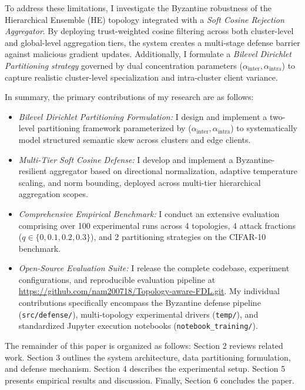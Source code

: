 \documentclass[11pt, a4paper]{article}
\begin{document}
To address these limitations, I investigate the Byzantine robustness of the Hierarchical Ensemble (HE) topology integrated with a \textit{Soft Cosine Rejection Aggregator}. By deploying trust-weighted cosine filtering across both cluster-level and global-level aggregation tiers, the system creates a multi-stage defense barrier against malicious gradient updates. Additionally, I formulate a \textit{Bilevel Dirichlet Partitioning strategy} governed by dual concentration parameters ($\alpha_{\text{inter}}, \alpha_{\text{intra}}$) to capture realistic cluster-level specialization and intra-cluster client variance. 

In summary, the primary contributions of my research are as follows:
\begin{itemize}
    \item \textit{Bilevel Dirichlet Partitioning Formulation:} I design and implement a two-level partitioning framework parameterized by ($\alpha_{\text{inter}}, \alpha_{\text{intra}}$) to systematically model structured semantic skew across clusters and edge clients.
    \item \textit{Multi-Tier Soft Cosine Defense:} I develop and implement a Byzantine-resilient aggregator based on directional normalization, adaptive temperature scaling, and norm bounding, deployed across multi-tier hierarchical aggregation scopes.
    \item \textit{Comprehensive Empirical Benchmark:} I conduct an extensive evaluation comprising over 100 experimental runs across 4 topologies, 4 attack fractions ($q \in \{0, 0.1, 0.2, 0.3\}$), and 2 partitioning strategies on the CIFAR-10 benchmark.
    \item \textit{Open-Source Evaluation Suite:} I release the complete codebase, experiment configurations, and reproducible evaluation pipeline at \url{https://github.com/nam200718/Topology-aware-FDL.git}. My individual contributions specifically encompass the Byzantine defense pipeline (\texttt{src/defense/}), multi-topology experimental drivers (\texttt{temp/}), and standardized Jupyter execution notebooks (\texttt{notebook\_training/}).
\end{itemize}

The remainder of this paper is organized as follows: Section 2 reviews related work. Section 3 outlines the system architecture, data partitioning formulation, and defense mechanism. Section 4 describes the experimental setup. Section 5 presents empirical results and discussion. Finally, Section 6 concludes the paper.
\end{document}
